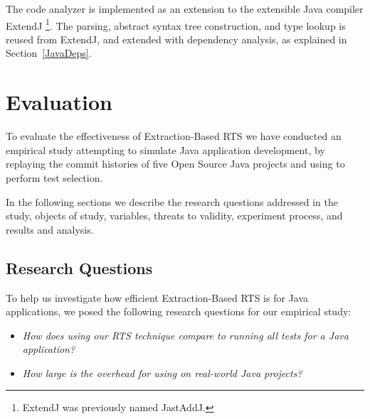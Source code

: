 {The code analyzer is implemented as an extension to the extensible Java compiler ExtendJ
\cite{jastaddj,oqvist2013extending}\footnote{ExtendJ was previously named JastAddJ.}. The parsing, abstract syntax tree construction, and type lookup is reused from ExtendJ, and extended with dependency analysis, as explained in Section~\ref{JavaDeps}.




\section{Evaluation}
\label{Evaluation}

To evaluate the effectiveness of Extraction-Based RTS we have conducted an empirical study
attempting to simulate Java application development, by replaying the commit histories
of five Open Source Java projects and using \ourtool{} to perform test selection.

In the following sections we describe the research questions addressed in the study, objects of
study, variables, threats to validity, experiment process, and results and analysis.

\subsection{Research Questions}

To help us investigate how efficient Extraction-Based RTS is for Java applications, we posed the
following research questions for our empirical study:

\begin{itemize}
  \item \emph{How does using our RTS technique compare to running all tests for a Java application?}
  \item \emph{How large is the overhead for using \ourtool{} on real-world Java projects?}
\end{itemize}

}
